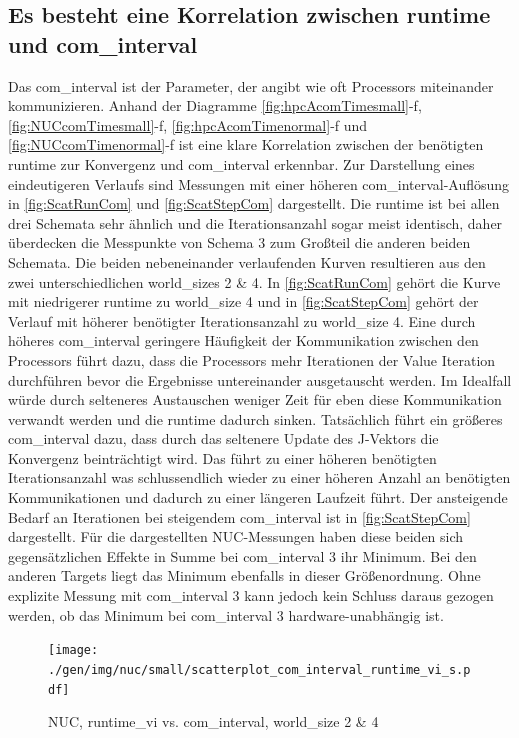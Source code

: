 \subsection{Es besteht eine Korrelation zwischen runtime und com\_interval}

Das com\_interval ist der Parameter, der angibt wie oft Processors miteinander kommunizieren. Anhand der Diagramme \autoref{fig:hpcAcomTimesmall}-f, \autoref{fig:NUCcomTimesmall}-f, \autoref{fig:hpcAcomTimenormal}-f und \autoref{fig:NUCcomTimenormal}-f ist eine klare Korrelation zwischen der benötigten runtime zur Konvergenz und com\_interval erkennbar. Zur Darstellung eines eindeutigeren Verlaufs sind Messungen mit einer höheren com\_interval-Auflösung in \autoref{fig:ScatRunCom} und \autoref{fig:ScatStepCom}
dargestellt. Die runtime ist bei allen drei Schemata sehr ähnlich und die Iterationsanzahl sogar meist identisch,
daher überdecken die Messpunkte von Schema 3 zum Großteil die anderen beiden Schemata. Die beiden nebeneinander verlaufenden Kurven resultieren aus den zwei unterschiedlichen world\_sizes 2 \& 4. In \autoref{fig:ScatRunCom} gehört die Kurve mit niedrigerer runtime zu world\_size 4 und in \autoref{fig:ScatStepCom} gehört der Verlauf mit höherer benötigter Iterationsanzahl zu world\_size 4. Eine durch höheres com\_interval geringere Häufigkeit der Kommunikation zwischen den Processors führt dazu, dass die Processors mehr Iterationen der Value Iteration durchführen bevor die Ergebnisse untereinander ausgetauscht werden. Im Idealfall würde durch selteneres Austauschen weniger Zeit für eben diese Kommunikation verwandt werden und die runtime dadurch sinken. Tatsächlich führt ein größeres com\_interval dazu, dass durch das seltenere Update des J-Vektors die Konvergenz beinträchtigt wird. Das führt zu einer höheren benötigten Iterationsanzahl was schlussendlich wieder zu einer höheren Anzahl an benötigten Kommunikationen und dadurch zu einer längeren Laufzeit führt. Der ansteigende Bedarf an Iterationen bei steigendem com\_interval ist in \autoref{fig:ScatStepCom}
dargestellt. Für die dargestellten NUC-Messungen haben diese beiden sich gegensätzlichen Effekte in Summe bei com\_interval 3 ihr Minimum. Bei den anderen Targets liegt das Minimum ebenfalls in dieser Größenordnung. Ohne explizite Messung mit com\_interval 3 kann jedoch kein Schluss daraus gezogen werden, ob das Minimum bei com\_interval 3 hardware-unabhängig ist.

\begin{figure}[h]
    \centering
    \texttt{[image: ./gen/img/nuc/small/scatterplot\_com\_interval\_runtime\_vi\_s.pdf]}
    \vspace*{-2mm}
    \caption{NUC, runtime\_vi vs. com\_interval, world\_size 2 \& 4}
    \label{fig:ScatRunCom}
\end{figure}

